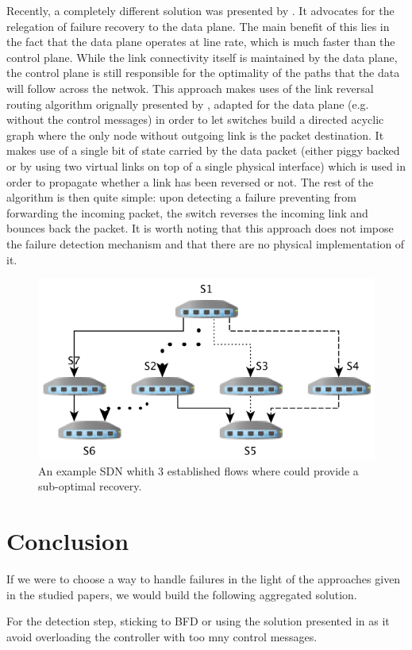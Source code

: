 \documentclass[]{IEEEtran}
\begin{document}
Recently, a completely different solution was presented by \cite{Liu:2013:ECV:2482626.2482639}. It advocates for the relegation of failure recovery to the data plane. The main benefit of this lies in the fact that the data plane operates at line rate, which is much faster than the control plane. While the link connectivity itself is maintained by the data plane, the control plane is still responsible for the optimality of the paths that the data will follow across the netwok. This approach makes uses of the link reversal routing algorithm orignally presented by \cite{1094876}, adapted for the data plane (e.g. without the control messages) in order to let switches build a directed acyclic graph where the only node without outgoing link is the packet destination. It makes use of a single bit of state carried by the data packet (either piggy backed or by using two virtual links on top of a single physical interface) which is used in order to propagate whether a link has been reversed or not. The rest of the algorithm is then quite simple: upon detecting a failure preventing from forwarding the incoming packet, the switch reverses the incoming link and bounces back the packet. It is worth noting that this approach does not impose the failure detection mechanism and that there are no physical implementation of it.

\begin{figure}
	\includegraphics[width=.5\textwidth]{images/enabling_failures.png}
	\caption{An example SDN whith 3 established flows where \cite{2911632} could provide a sub-optimal recovery.}
	\label{fig:failures}
\end{figure}

\section{Conclusion}
If we were to choose a way to handle failures in the light of the approaches given in the studied papers, we would build the following aggregated solution.

For the detection step, sticking to BFD or using the solution presented in \cite{6364688} as it avoid overloading the controller with too mny control messages.
\end{document}
